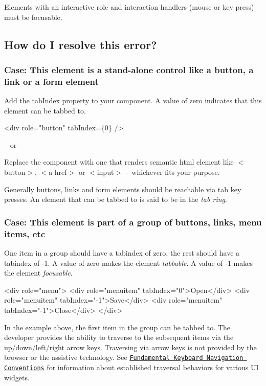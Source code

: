 Elements with an interactive role and interaction handlers (mouse or key press) must be focusable.

\subsection*{How do I resolve this error?}

\subsubsection*{Case\+: This element is a stand-\/alone control like a button, a link or a form element}

Add the {\ttfamily tab\+Index} property to your component. A value of zero indicates that this element can be tabbed to.


\begin{DoxyCode}
<div
  role="button"
  tabIndex=\{0\} />
\end{DoxyCode}


-- or --

Replace the component with one that renders semantic html element like {\ttfamily $<$button$>$}, {\ttfamily $<$a href$>$} or {\ttfamily $<$input$>$} -- whichever fits your purpose.

Generally buttons, links and form elements should be reachable via tab key presses. An element that can be tabbed to is said to be in the {\itshape tab ring}.

\subsubsection*{Case\+: This element is part of a group of buttons, links, menu items, etc}

One item in a group should have a tabindex of zero, the rest should have a tabindex of -\/1. A value of zero makes the element {\itshape tabbable}. A value of -\/1 makes the element {\itshape focusable}.


\begin{DoxyCode}
<div role="menu">
  <div role="menuitem" tabIndex="0">Open</div>
  <div role="menuitem" tabIndex="-1">Save</div>
  <div role="menuitem" tabIndex="-1">Close</div>
</div>
\end{DoxyCode}


In the example above, the first item in the group can be tabbed to. The developer provides the ability to traverse to the subsequent items via the up/down/left/right arrow keys. Traversing via arrow keys is not provided by the browser or the assistive technology. See \href{https://www.w3.org/TR/wai-aria-practices-1.1/#kbd_generalnav}{\tt Fundamental Keyboard Navigation Conventions} for information about established traversal behaviors for various UI widgets.

